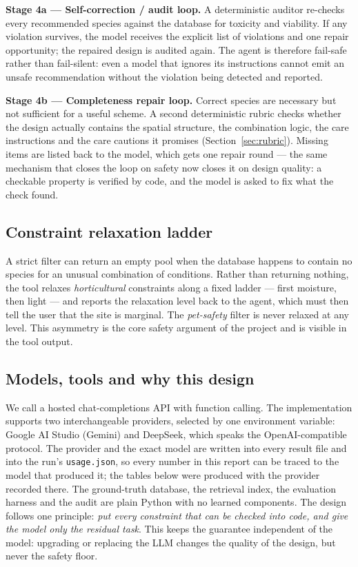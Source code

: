 \documentclass[12pt,a4paper]{article}
\begin{document}
\textbf{Stage 4a --- Self-correction / audit loop.} A deterministic auditor
re-checks every recommended species against the database for toxicity and
viability. If any violation survives, the model receives the explicit list of
violations and one repair opportunity; the repaired design is audited again.
The agent is therefore fail-safe rather than fail-silent: even a model that
ignores its instructions cannot emit an unsafe recommendation without the
violation being detected and reported.

\textbf{Stage 4b --- Completeness repair loop.} Correct species are
necessary but not sufficient for a useful scheme. A second deterministic
rubric checks whether the design actually contains the spatial structure, the
combination logic, the care instructions and the care cautions it promises
(Section~\ref{sec:rubric}). Missing items are listed back to the model, which
gets one repair round --- the same mechanism that closes the loop on safety
now closes it on design quality: a checkable property is verified by code,
and the model is asked to fix what the check found.

\subsection{Constraint relaxation ladder}

A strict filter can return an empty pool when the database happens to contain
no species for an unusual combination of conditions. Rather than returning
nothing, the tool relaxes \emph{horticultural} constraints along a fixed
ladder --- first moisture, then light --- and reports the relaxation level
back to the agent, which must then tell the user that the site is marginal.
The \emph{pet-safety} filter is never relaxed at any level. This asymmetry is
the core safety argument of the project and is visible in the tool output.

\subsection{Models, tools and why this design}

We call a hosted chat-completions API with function calling. The
implementation supports two interchangeable providers, selected by one
environment variable: Google AI Studio (Gemini) and DeepSeek, which speaks
the OpenAI-compatible protocol. The provider and the exact model are written
into every result file and into the run's \texttt{usage.json}, so every number
in this report can be traced to the model that produced it; the tables below
were produced with the provider recorded there. The ground-truth database,
the retrieval index, the evaluation harness and the audit are plain Python
with no learned components. The design follows one principle: \emph{put every
constraint that can be checked into code, and give the model only the residual
task}. This keeps the guarantee independent of the model: upgrading or
replacing the LLM changes the quality of the design, but never the safety
floor.
\end{document}
